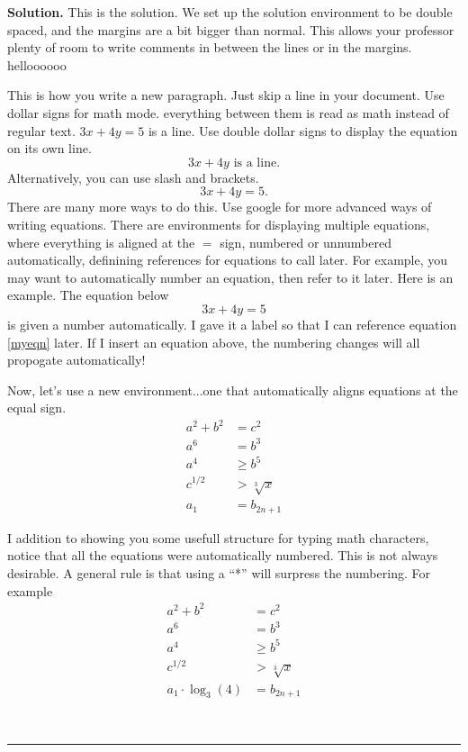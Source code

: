 \documentclass[10pt,leqno ]{article}
\theoremstyle{definition}
\newenvironment{solution}[1][Solution]{\begin{doublespace}\textbf{#1.}\quad }{\ \rule{0.5em}{0.5em}\end{doublespace}}
\begin{document}
\begin{solution}
This is the solution. We set up the solution environment to be double spaced, and the margins
are a bit bigger than normal. This allows your professor plenty of room to write comments
in between the lines or in the margins. helloooooo

This is how you write a new paragraph. Just skip a line in your document.
Use dollar signs for math mode. everything between them is read as math instead
of regular text. $3x+4y=5$ is a line.
Use double dollar signs to display the equation on its own line. $$3x+4y \text{ is a line.}$$
Alternatively, you can use slash and brackets.
\[
3x+4y=5.
\]
There are many more ways to do this.
Use google for more advanced ways of writing equations. There are environments
for displaying multiple equations, where everything is aligned at the $=$ sign,
numbered or unnumbered automatically, definining references for equations to call later.
For example, you may want to automatically number an equation, then refer to it later.
Here is an example. The equation below
\begin{equation}\label{myeqn}
3x+4y=5
\end{equation}
is given a number automatically. I gave it a label so that I can reference 
equation \eqref{myeqn} later. If I insert an equation above, the numbering changes 
will all propogate automatically! 

Now, let's use a new environment...one that automatically aligns equations at the equal sign.
\begin{align}
a^2 + b^2 &= c^2 \\ %
a^6 &= b^3 \\ %
a^4 &\ge b^5\\ %
c^{1/2} &> \sqrt[3]{x}\\
a_1 &= b_{2n+1}
\end{align}

I addition to showing you some usefull structure for typing math characters, notice that
all the equations were automatically numbered. This is not always desirable. A general rule
is that using a ``*'' will surpress the numbering. For example
\begin{align*}
a^2 + b^2 &= c^2 \\ %
a^6 &= b^3 \\ %
a^4 &\ge b^5\\ %
c^{1/2} &> \sqrt[3]{x}\\
a_1\cdot \log_3 (4) &= b_{2n+1} %
\end{align*}


\end{solution}
\end{document}
